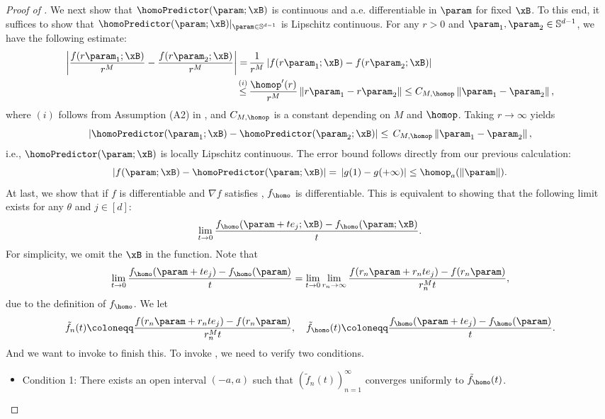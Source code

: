 \begin{proof}[Proof of ]
We next show that $\homoPredictor (\param; \xB)$ is continuous and a.e. differentiable in $\param$ for fixed $\xB$. To this end, it suffices to show that $\homoPredictor (\param; \xB) \vert_{\param \in \mathbb{S}^{d-1}}$ is Lipschitz continuous. For any $r > 0$ and $\param_1, \param_2 \in \mathbb{S}^{d-1}$, we have the following estimate:
\begin{align*}
\left\vert \frac{f(r \param_1; \xB)}{r^M} - \frac{f(r \param_2; \xB)}{r^M} \right\vert = \, & \frac{1}{r^M} \left\vert f(r \param_1; \xB) - f(r \param_2; \xB) \right\vert \\
\stackrel{(i)}{\le} \, & \frac{\homop'(r)}{r^M} \left\| r \param_1 - r \param_2 \right\| \le C_{M, \homop} \left\| \param_1 - \param_2 \right\|,
\end{align*}
where $(i)$ follows from Assumption (A2) in , and $C_{M, \homop}$ is a constant depending on $M$ and $\homop$. Taking $r \to \infty$ yields
\begin{equation*}
\left\vert \homoPredictor (\param_1; \xB) - \homoPredictor (\param_2; \xB) \right\vert \le \, C_{M, \homop} \left\| \param_1 - \param_2 \right\|,
\end{equation*}
i.e., $\homoPredictor (\param; \xB)$ is locally Lipschitz continuous. The error bound follows directly from our previous calculation:
\[
\left\vert f(\param; \xB) - \homoPredictor (\param; \xB) \right\vert = \, \left\vert g(1) - g(+\infty) \right\vert \le \homop_a( \left\| \param \right\| ).
\]
At last, we show that if $f$ is differentiable and $\nabla f$ satisfies , $f_{\homo}$ is differentiable.  This is equivalent to showing that the following limit exists for any $\theta$ and $j\in [d]$: 
\[
\lim_{t\to 0} \frac{f_\homo(\param + t e_j;\xB) - f_\homo(\param;\xB)}{t}. 
\]
For simplicity, we omit the $\xB$ in the function. Note that 
\[
\lim_{t\to 0} \frac{f_\homo(\param + t e_j) - f_\homo(\param)}{t} = \lim_{t\to 0} \lim_{r_n \to \infty} \frac{f(r_n\param + r_n t e_j) - f(r_n\param)}{r_n^M t},
\]
due to the definition of $f_{\homo}$.  We let 
\[
    \tilde f_n(t) \coloneqq \frac{f(r_n\param + r_n t e_j) - f(r_n\param)}{r_n^M t}, \quad \tilde f_{\homo}(t) \coloneqq \frac{f_\homo(\param + t e_j) - f_\homo(\param)}{t}. 
\]
And we want to invoke  to finish this. 
To invoke , we need to verify two conditions.  
\begin{itemize}
    \item Condition 1: There exists an open interval $(-a, a)$ such that $(\tilde f_n(t))_{n=1}^\infty$ converges uniformly to $\tilde f_\homo (t)$.

\end{itemize}
\end{proof}
